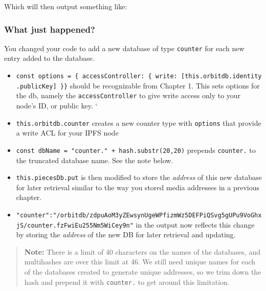Which will then output something like:

\begin{Shaded}
\begin{Highlighting}[]
\FunctionTok{\{}
  \FunctionTok{:}\FunctionTok{,}
  \FunctionTok{:}\FunctionTok{,}
  \FunctionTok{:}
\FunctionTok{\}}
\end{Highlighting}
\end{Shaded}

\subsubsection{What just happened?}\label{what-just-happened-10}

You changed your code to add a new database of type \texttt{counter} for
each new entry added to the database.

\begin{itemize}
\tightlist
\item
  \texttt{const\ options\ =\ \{\ accessController:\ \{\ write:\ {[}this.orbitdb.identity.publicKey{]}\ \}\}}
  should be recognizable from Chapter 1. This sets options for the db,
  namely the \texttt{accessController} to give write access only to your
  node's ID, or public key. `
\item
  \texttt{this.orbitdb.counter} creates a new counter type with
  \texttt{options} that provide a write ACL for your IPFS node
\item
  \texttt{const\ dbName\ =\ "counter."\ +\ hash.substr(20,20)} prepends
  \texttt{counter.} to the truncated database name. See the note below.
\item
  \texttt{this.piecesDb.put} is then modified to store the
  \emph{address} of this new database for later retrieval similar to the
  way you stored media addresses in a previous chapter.
\item
  \texttt{"counter":"/orbitdb/zdpuAoM3yZEwsynUgeWPfizmWz5DEFPiQSvg5gUPu9VoGhxjS/counter.fzFwiEu255Nm5WiCey9n"}
  in the output now reflects this change by storing the \emph{address}
  of the new DB for later retrieval and updating.
\end{itemize}

\begin{quote}
\textbf{Note:} There is a limit of 40 characters on the names of the
databases, and multihashes are over this limit at 46. We still need
unique names for each of the databases created to generate unique
addresses, so we trim down the hash and prepend it with
\texttt{counter.} to get around this limitation.
\end{quote}

